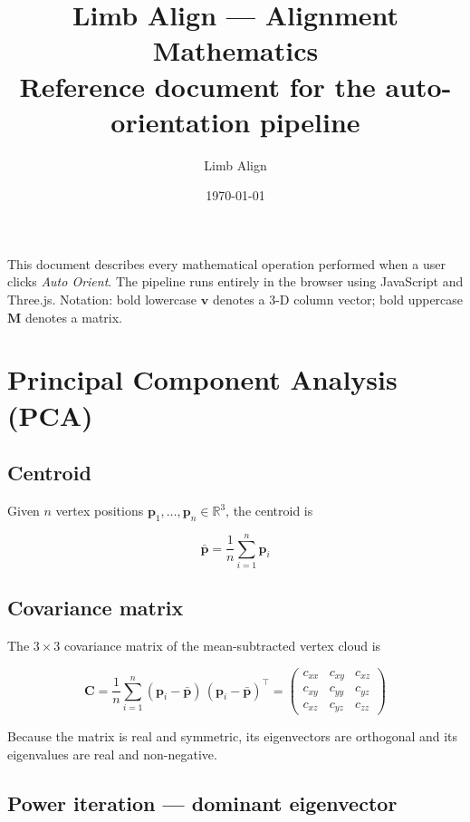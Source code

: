 \documentclass[11pt, a4paper]{article}
\title{\textbf{Limb Align — Alignment Mathematics}\\[0.4em]
  \large Reference document for the auto-orientation pipeline}
\author{Limb Align}
\date{\today}
\begin{document}
\maketitle
\tableofcontents
\vspace{1em}

This document describes every mathematical operation performed when a user
clicks \textit{Auto Orient}.  The pipeline runs entirely in the browser using
JavaScript and Three.js.  Notation: bold lowercase $\bm{v}$ denotes a 3-D
column vector; bold uppercase $\bm{M}$ denotes a matrix.

\section{Principal Component Analysis (PCA)}

\subsection{Centroid}

Given $n$ vertex positions $\bm{p}_1, \ldots, \bm{p}_n \in \mathbb{R}^3$, the
centroid is

\begin{equation}
  \bar{\bm{p}} = \frac{1}{n} \sum_{i=1}^{n} \bm{p}_i
\end{equation}

\subsection{Covariance matrix}

The $3 \times 3$ covariance matrix of the mean-subtracted vertex cloud is

\begin{equation}
  \bm{C} = \frac{1}{n} \sum_{i=1}^{n}
    (\bm{p}_i - \bar{\bm{p}})\,(\bm{p}_i - \bar{\bm{p}})^{\!\top}
  =
  \begin{pmatrix}
    c_{xx} & c_{xy} & c_{xz} \\
    c_{xy} & c_{yy} & c_{yz} \\
    c_{xz} & c_{yz} & c_{zz}
  \end{pmatrix}
\end{equation}

Because the matrix is real and symmetric, its eigenvectors are orthogonal and
its eigenvalues are real and non-negative.

\subsection{Power iteration — dominant eigenvector}
\end{document}
